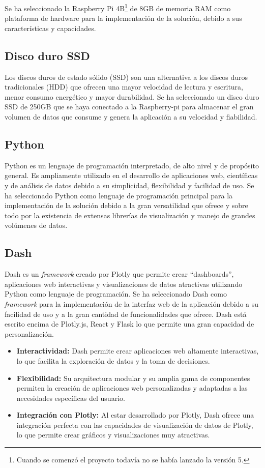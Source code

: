 \noindent Se ha seleccionado la Raspberry Pi 4B\footnote{Cuando se comenzó el proyecto todavía no se había lanzado la versión 5.} de 8GB de memoria RAM como plataforma de hardware para la implementación de la solución, debido a sus características y capacidades.

\subsection{Disco duro SSD}
Los discos duros de estado sólido (SSD) son una alternativa a los discos duros tradicionales (HDD) que ofrecen una mayor velocidad de lectura y escritura, menor consumo energético y mayor durabilidad. Se ha seleccionado un disco duro SSD de 250GB que se haya conectado a la Raspberry-pi para almacenar el gran volumen de datos que consume y genera la aplicación a su velocidad y fiabilidad.

\subsection{Python}
Python es un lenguaje de programación interpretado, de alto nivel y de propósito general. Es ampliamente utilizado en el desarrollo de aplicaciones web, científicas y de análisis de datos debido a su simplicidad, flexibilidad y facilidad de uso. Se ha seleccionado Python como lenguaje de programación principal para la implementación de la solución debido a la gran versatilidad que ofrece y sobre todo por la existencia de extensas librerías de visualización y manejo de grandes volúmenes de datos.

\subsection{Dash}
Dash es un \textit{framework} creado por Plotly que permite crear ``dashboards'', aplicaciones web interactivas y visualizaciones de datos atractivas utilizando Python como lenguaje de programación. Se ha seleccionado Dash como \textit{framework} para la implementación de la interfaz web de la aplicación debido a su facilidad de uso y a la gran cantidad de funcionalidades que ofrece. Dash está escrito encima de Plotly.js, React y Flask lo que permite una gran capacidad de personalización.

\begin{itemize}
	\item \textbf{Interactividad:} Dash permite crear aplicaciones web altamente interactivas, lo que facilita la exploración de datos y la toma de decisiones.
	\item \textbf{Flexibilidad:} Su arquitectura modular y su amplia gama de componentes permiten la creación de aplicaciones web personalizadas y adaptadas a las necesidades específicas del usuario.
	\item \textbf{Integración con Plotly:} Al estar desarrollado por Plotly, Dash ofrece una integración perfecta con las capacidades de visualización de datos de Plotly, lo que permite crear gráficos y visualizaciones muy atractivas.
\end{itemize}

